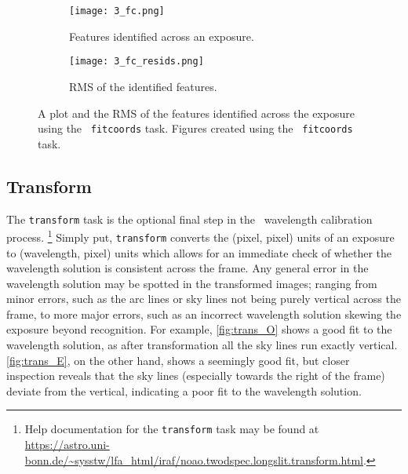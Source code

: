\begin{figure}
    \centering
    \begin{subfigure}[b]{0.49\textwidth}
        \centering
        \texttt{[image: 3\_fc.png]}
        \caption{Features identified across an exposure.}
    \end{subfigure}
    \hfill
    \begin{subfigure}[b]{0.49\textwidth}
        \centering
        \texttt{[image: 3\_fc\_resids.png]}
        \caption{\gls{RMS} of the identified features.}
    \end{subfigure}
    \caption{A plot and the \gls{RMS} of the features identified across the exposure using the \iraf\ \texttt{fitcoords} task. Figures created using the \iraf\ \texttt{fitcoords} task.}
    \label{fig:iraf_fc_plot}
\end{figure}

\subsection{Transform} \label{subsec:iraf_transform}

The \texttt{transform} task is the optional final step in the \iraf\ wavelength calibration process.%
\footnote{Help documentation for the \texttt{transform} task may be found at \url{https://astro.uni-bonn.de/~sysstw/lfa_html/iraf/noao.twodspec.longslit.transform.html}.}
Simply put, \texttt{transform} converts the (pixel, pixel) units of an exposure to (wavelength, pixel) units which allows for an immediate check of whether the wavelength solution is consistent across the frame. Any general error in the wavelength solution may be spotted in the transformed images; ranging from minor errors, such as the arc lines or sky lines not being purely vertical across the frame, to more major errors, such as an incorrect wavelength solution skewing the exposure beyond recognition.
For example, \autoref{fig:trans_O} shows a good fit to the wavelength solution, as after transformation all the sky lines run exactly vertical. \autoref{fig:trans_E}, on the other hand, shows a seemingly good fit, but closer inspection reveals that the sky lines (especially towards the right of the frame) deviate from the vertical, indicating a poor fit to the wavelength solution.

